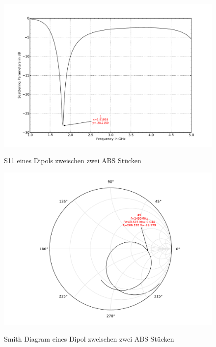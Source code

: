 \begin{figure}[!htb]
\begin{center}
  \includegraphics[width=\linewidth]{content/bilder/Evaluation/Dipol/S11DipolZweiABS.pdf}
  \caption{S11 eines Dipols zweischen zwei ABS Stücken}\label{fig:S11_Dipol_Zwei_ABS_5}
\endminipage%
{}
  \includegraphics[width=\linewidth]{content/bilder/Evaluation/Dipol/SmithDipolZweiABS.pdf}
  \caption{Smith Diagram eines Dipol zweischen zwei ABS Stücken}\label{fig:Smith_Dipol_Zwei_ABS_6}
\endminipage
\end{center}
\end{figure}

